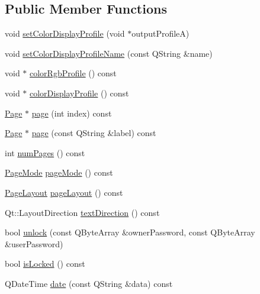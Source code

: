 \subsection*{Public Member Functions}
\begin{DoxyCompactItemize}
\item 
void \hyperlink{class_poppler_1_1_document_a8b4dd39c8b59c19ab935d772e067f0c4}{set\+Color\+Display\+Profile} (void $\ast$output\+ProfileA)
\item 
void \hyperlink{class_poppler_1_1_document_aa72744f77b5b185fee257e32847f62c4}{set\+Color\+Display\+Profile\+Name} (const Q\+String \&name)
\item 
void $\ast$ \hyperlink{class_poppler_1_1_document_a9f234d4f9b916787d88bfda9b29af08e}{color\+Rgb\+Profile} () const
\item 
void $\ast$ \hyperlink{class_poppler_1_1_document_a48f8c5ecc4e261d6059ca055912adf6a}{color\+Display\+Profile} () const
\item 
\hyperlink{class_poppler_1_1_page}{Page} $\ast$ \hyperlink{class_poppler_1_1_document_ae4535b0dc763d6be42d775fa5d40c93a}{page} (int index) const
\item 
\hyperlink{class_poppler_1_1_page}{Page} $\ast$ \hyperlink{class_poppler_1_1_document_a362452915b71f8d534114781c27e6dc0}{page} (const Q\+String \&label) const
\item 
int \hyperlink{class_poppler_1_1_document_a260f9b7105860a757aa1b018cd4f6ccb}{num\+Pages} () const
\item 
\hyperlink{class_poppler_1_1_document_a7157091ddc85f62b02cfc35a08c4822b}{Page\+Mode} \hyperlink{class_poppler_1_1_document_a9dd899cd7515f97320994c2a24cee316}{page\+Mode} () const
\item 
\hyperlink{class_poppler_1_1_document_a27b1574f15e09ae08b7acf7cc98f3fbd}{Page\+Layout} \hyperlink{class_poppler_1_1_document_a7074424a989911de79f781ab77b23652}{page\+Layout} () const
\item 
Qt\+::\+Layout\+Direction \hyperlink{class_poppler_1_1_document_a854e191808926d0bcf277a97243f5737}{text\+Direction} () const
\item 
bool \hyperlink{class_poppler_1_1_document_a5eb83ee712c9e146ccbcb21c3a9ce662}{unlock} (const Q\+Byte\+Array \&owner\+Password, const Q\+Byte\+Array \&user\+Password)
\item 
bool \hyperlink{class_poppler_1_1_document_a21399ffda439d05aa493dceba9bf8c50}{is\+Locked} () const
\item 
Q\+Date\+Time \hyperlink{class_poppler_1_1_document_a7e97595aa9634c4bc65d4bdd3ae6314f}{date} (const Q\+String \&data) const

\end{DoxyCompactItemize}
